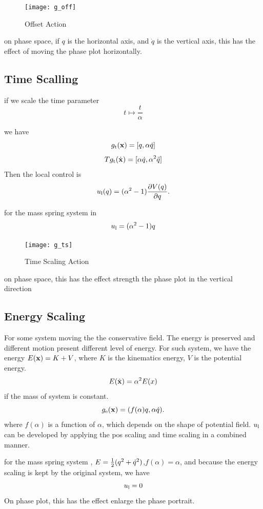 \begin{figure}[!htbp]
  \begin{center}
      \texttt{[image: g\_off]}
    \caption{Offset Action}
    \label{fig:goff}
\end{center}
\end{figure}
on phase space, if $q$ is the horizontal axis, and $\dot{q}$ is the vertical axis, this has the effect of moving the phase plot horizontally.

\subsection*{Time Scalling}

if we scale the time parameter
\[
t \mapsto \frac{t}{\alpha}
\]

we have
\[
g_{\mathrm{t}}(\mathbf{x})=[q,\alpha \dot{q}]
\]
\[
Tg_{\mathrm{t}}(\dot{\mathbf{x}})=[\alpha \dot{q},\alpha^2 \ddot{q}]
\]
Then the local control is 
\begin{equation}
u_{\mathrm{l}}(q) = (\alpha^2 - 1) \frac{\partial V(q)}{\partial q}.
\end{equation}

for the mass spring system in
\[
u_{\mathrm{l}}=(\alpha^2-1)q
\] 

\begin{figure}[!htbp]
  \begin{center}
    \texttt{[image: g\_ts]}
	 \caption{Time Scaling Action}
    \label{fig:gts}
\end{center}
\end{figure}
on phase space, this has the effect strength the phase plot in the vertical direction

\subsection*{Energy Scaling}
For some system moving the the conservative field.
The energy is preserved and different motion present different level of energy.
For such system, we have the energy $E(\mathbf{x})=K+V$, where $K$ is the kinematics energy,
$V$ is the potential energy.
\[
E(\hat{\mathbf{x}})=\alpha^2 E(x)
\]
if the mass of system is constant.
\[
g_{\mathrm{e}}(\mathbf{x})=(f(\alpha) q,\alpha \dot{q}).
\]
where $f(\alpha)$ is a function of $\alpha$, which depends on the shape of potential field.
$u_{\mathrm{l}}$ can be developed by applying the pos scaling and time scaling in a combined manner.



for the mass spring system , $E=\frac{1}{2}(q^2+\dot{q}^2)$,$f(\alpha)=\alpha$, and because the energy scaling is kept by the original system, we have
\[
u_{\mathrm{l}}=0
\]
On phase plot, this has the effect enlarge the phase portrait.

